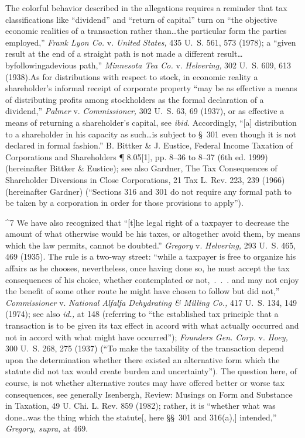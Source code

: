   The colorful behavior described in the allegations requires a
reminder that tax classifications like ``dividend'' and ``return of
capital'' turn on ``the objective economic realities of a transaction
rather than\dots the particular form the parties employed,''
\emph{Frank Lyon Co.} v. \emph{United States,} 435 U.~S. 561, 573 (1978);
a ``given result at the end of a straight path is not made a different
result\dots byfollowingadevious path,'' \emph{Minnesota Tea Co.} v.
\emph{Helvering,} 302 U.~S. 609, 613 (1938).\footnotemark[7] As for distributions
with respect to stock, in economic reality a shareholder's informal
receipt of corporate property ``may be as effective a means of
distributing profits among stockholders as the formal declaration
of a dividend,'' \emph{Palmer} v. \emph{Commissioner,} 302 U.~S. 63,
69 (1937), or as effective a means of returning a shareholder's
capital, see \emph{ibid.} Accordingly, ``[a] distribution to a shareholder
in his capacity as such\dots \newpage  is subject to \S~301 even
though it is not declared in formal fashion.'' B. Bittker \& J.
Eustice, Federal Income Taxation of Corporations and Shareholders ¶
8.05[1], pp. 8--36 to 8--37 (6th ed. 1999) (hereinafter Bittker
\& Eustice); see also Gardner, The Tax Consequences of Shareholder
Diversions in Close Corporations, 21 Tax L. Rev. 223, 239 (1966)
(hereinafter Gardner) (``Sections 316 and 301 do not require any formal
path to be taken by a corporation in order for those provisions to
apply'').

^7 We have also recognized that ``[t]he legal right of a taxpayer to
decrease the amount of what otherwise would be his taxes, or altogether
avoid them, by means which the law permits, cannot be doubted.''
\emph{Gregory} v. \emph{Helvering,} 293 U.~S. 465, 469 (1935). The rule
is a two-way street: ``while a taxpayer is free to organize his affairs
as he chooses, nevertheless, once having done so, he must accept the
tax consequences of his choice, whether contemplated or not,~.~.~.
and may not enjoy the benefit of some other route he might have chosen
to follow but did not,'' \emph{Commissioner} v. \emph{National Alfalfa
Dehydrating \& Milling Co.,} 417 U.~S. 134, 149 (1974); see also
\emph{id.,} at 148 (referring to ``the established tax principle that a
transaction is to be given its tax effect in accord with what actually
occurred and not in accord with what might have occurred''); \emph{Founders
Gen. Corp.} v. \emph{Hoey,} 300 U.~S. 268, 275 (1937) (``To make the
taxability of the transaction depend upon the determination whether
there existed an alternative form which the statute did not tax would
create burden and uncertainty''). The question here, of course, is
not whether alternative routes may have offered better or worse tax
consequences, see generally Isenbergh, Review: Musings on Form and
Substance in Taxation, 49 U. Chi. L. Rev. 859 (1982); rather, it is
``whether what was done\dots was the thing which the statute[, here
\S\S~301 and 316(a),] intended,'' \emph{Gregory, supra,} at 469.


